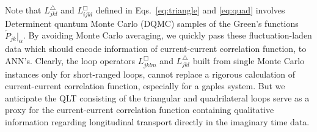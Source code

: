 \documentclass[amsmath,amssymb, aps, prl, twocolumn]{revtex4-1}
\begin{document}
Note that  $L^\triangle_{jkl}$ and  $L^\Box_{ijkl}$ defined in Eqs.~\ref{eq:triangle} and \ref{eq:quad} involves  Determinent quantum Monte Carlo (DQMC) samples of the Green's functions $\widetilde{P}_{jk}|_{\alpha}$. By avoiding Monte Carlo averaging, we quickly pass these fluctuation-laden data which should encode information of current-current correlation function,  to ANN's. 
Clearly, the loop operators $L^\Box_{jklm}$ and $ L^\triangle_{jkl}$ built from single Monte Carlo instances only for short-ranged loops, cannot replace a rigorous calculation of current-current correlation function, especially for a gaples system. But we anticipate the QLT consisting of the triangular and quadrilateral loops serve as a proxy for the current-current correlation function containing qualitative information regarding longitudinal transport directly in the imaginary time data.  

\end{document}
